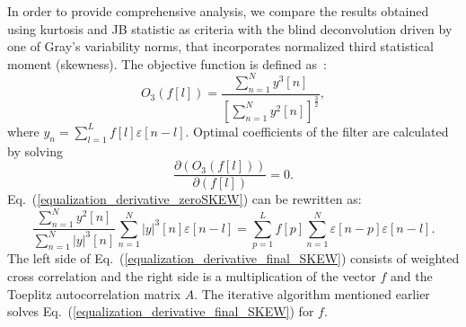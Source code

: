 In order to provide comprehensive analysis, we compare the results obtained using kurtosis and JB statistic as criteria with the blind deconvolution driven by one of Gray's variability norms, that incorporates normalized third statistical moment (skewness). The objective function is defined as~\cite{Gray1979}:
\begin{equation}
O_3\left(f\left[l\right]\right)=\frac{\sum\limits_{n=1}^{N} y^3[n]}{\left[\sum\limits_{n=1}^{N} y^2[n]\right]^\frac{3}{2}},
\label{equalization_SKEWNESScriterion}
\end{equation}
where $y_n=\sum\limits_{l=1}^{L} f[l]\varepsilon [n-l]$. Optimal coefficients of the filter are calculated by solving
\begin{equation}
\frac{\partial \left(O_3\left(f\left[l\right]\right)\right)}{\partial \left(f[l]\right)}=0.
\label{equalization_derivative_zeroSKEW}
\end{equation}
Eq.~(\ref{equalization_derivative_zeroSKEW}) can be rewritten as:
\begin{equation}
\frac{\sum\limits_{n=1}^{N} y^2[n]}{\sum\limits_{n=1}^{N} \left| y\right|^3[n]}\sum\limits_{n=1}^{N}\left|y\right|^3[n]\varepsilon[n-l]=\sum\limits_{p=1}^{L} f[p] \sum\limits_{n=1}^{N} \varepsilon[n-p]\varepsilon[n-l].
\label{equalization_derivative_final_SKEW}
\end{equation}
The left side of Eq.~(\ref{equalization_derivative_final_SKEW}) consists of weighted cross correlation and the right side is a multiplication of  the vector $f$ and the Toeplitz autocorrelation matrix $A$. The iterative algorithm mentioned earlier solves Eq.~(\ref{equalization_derivative_final_SKEW}) for $f$.
